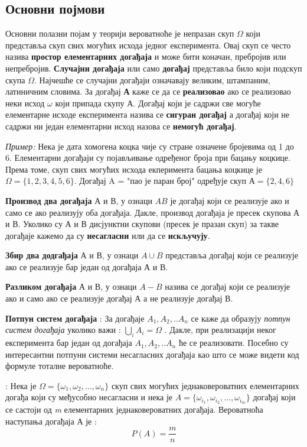 \subsection{Основни појмови}


Основни полазни појам у теорији вероватноће је непразан скуп $\Omega$ који представља скуп свих могућих исхода једног експеримента. Овај скуп се често назива \textbf{простор елементарних догађаја} и може бити коначан, пребројив или непребројив. 
\textbf{Случајни догађаја} или само \textbf{догађај} представља било који подскуп скупа $\Omega$. Најчешће се случајни догађаји означавају великим, штампаним, латиничним словима. За догађај \textbf{А} каже се да се \textbf{реализовао} ако се реализовао неки исход $\omega$ који припада скупу А. Догађај који је садржи све могуће елементарне исходе експеримента назива се \textbf{сигуран догађај} а догађај који не садржи ни један елементарни исход назова се \textbf{немогућ догађај}.


\textit{Пример:}
Нека је дата хомогена коцка чије су стране означене бројевима од 1 до 6. Елементарни догађаји су појављивање одређеног броја при бацању коцкице. Према томе, скуп свих могућих исхода екперимента бацања коцкице је $ \Omega = \lbrace 1,2,3,4,5,6 \rbrace $. Догађај A = "пао је паран број" одређује скуп $ $А$ = \lbrace 2,4,6 \rbrace $


\textbf{Производ два догађаја} $ А $ и $ В $, у ознаци $ AB $ је догађај који се реализује ако и само се ако реализују оба догађаја. Дакле, производ догађаја је пресек скупова А и В. Уколико су А и В дисјунктни скупови (пресек је празан скуп) за такве догађаје кажемо да су \textbf{несагласни} или да се \textbf{искључују}.

\textbf{Збир два додгађаја} А и В, у ознаци $ A \cup B $ представља догађај који се реализује ако се реализује бар један од догађаја А и В. 

\textbf{Разликом догађаја} А и В, у ознаци $ A -  B $ назива се догађај који се реализује ако и само ако се реализује догађај А  а не реализује догађај В. 

\textbf{Потпун систем догађаја} : За догађаје $ A_1,A_2,..A_n$ се каже да образују \textit{потпун систем догађаја} уколико важи : $ \bigcup_{i} A_i = \Omega $ . Дакле, при реализацији неког експеримента бар један од догађаја $ A_1,A_2,..A_n$ ће се реализовати. Посебно су интересантни потпуни системи несагласних догађаја као што се може видети код формуле тоталне вероватноће.

\begin{de}
 : Нека је $ \Omega = \lbrace \omega_1,\omega_2,...,\omega_n \rbrace $ скуп свих могућих једнаковероватних елементарних догађа који су међусобно несагласни и нека је $ A = \lbrace \omega_{i_1}, \omega_{i_2}, ... , \omega_{i_m} \rbrace $ догађај који се састоји од \textit{m} елементарних једнаковероватних догађаја. Вероватноћа наступања догађаја А је :
\begin{equation}
 P(A) = \frac{m}{n} 
\end{equation}
\end{de}

